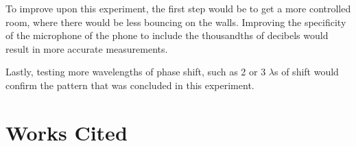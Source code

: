 \documentclass[index]{subfiles}
\begin{document}
To improve upon this experiment, the first step would be to get a more controlled room, where there would be less bouncing on the walls. Improving the specificity of the microphone of the phone to include the thousandths of decibels would result in more accurate measurements.

Lastly, testing more wavelengths of phase shift, such as 2 or 3 \(\lambda\)s of shift would confirm the pattern that was concluded in this experiment.


\section{Works Cited}


\end{document}
